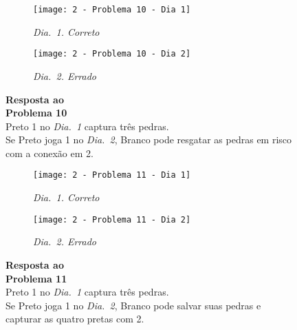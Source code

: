 \begin{SCfigure}[][h!]
    \begin{subfigure}[t]{.31\textwidth}
        \texttt{[image: 2 - Problema 10 - Dia 1]}
        \captionsetup{justification=centering}
        \caption*{\emph{Dia.\@~1. Correto}}
    \end{subfigure}
    \hfill
    \begin{subfigure}[t]{.31\textwidth}
        \texttt{[image: 2 - Problema 10 - Dia 2]}
        \captionsetup{justification=centering}
        \caption*{\emph{Dia.\@~2. Errado}}
    \end{subfigure}
    \hfill
    \caption*{\textbf{Resposta ao\\Problema 10}\\\vspace*{.25cm}Preto 1 no \emph{Dia.\@~1} captura três pedras.\\\vspace*{.25cm}Se Preto joga 1 no \emph{Dia.\@~2}, Branco pode resgatar as pedras em risco com a conexão em 2.}
\end{SCfigure}

\vfill

\begin{SCfigure}[][h!]
    \begin{subfigure}[t]{.31\textwidth}
        \texttt{[image: 2 - Problema 11 - Dia 1]}
        \captionsetup{justification=centering}
        \caption*{\emph{Dia.\@~1. Correto}}
    \end{subfigure}
    \hfill
    \begin{subfigure}[t]{.31\textwidth}
        \texttt{[image: 2 - Problema 11 - Dia 2]}
        \captionsetup{justification=centering}
        \caption*{\emph{Dia.\@~2. Errado}}
    \end{subfigure}
    \hfill
    \caption*{\textbf{Resposta ao\\Problema 11}\\\vspace*{.25cm}Preto 1 no \emph{Dia.\@~1} captura três pedras.\\\vspace*{.25cm}Se Preto joga 1 no \emph{Dia.\@~2}, Branco pode salvar suas pedras e capturar as quatro pretas com 2.}
\end{SCfigure}

\vfill

